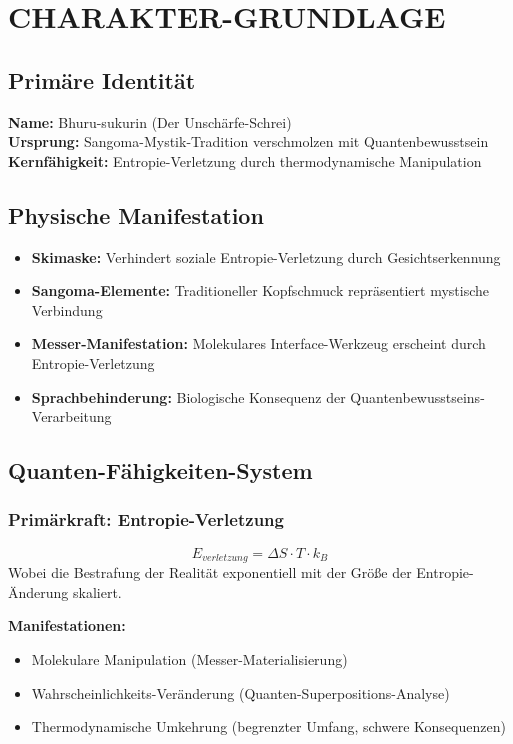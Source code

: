 \documentclass[12pt,a4paper]{article}
\begin{document}
\section{CHARAKTER-GRUNDLAGE}

\subsection{Primäre Identität}
\textbf{Name:} Bhuru-sukurin (Der Unschärfe-Schrei)\\
\textbf{Ursprung:} Sangoma-Mystik-Tradition verschmolzen mit Quantenbewusstsein\\
\textbf{Kernfähigkeit:} Entropie-Verletzung durch thermodynamische Manipulation

\subsection{Physische Manifestation}
\begin{itemize}
\item \textbf{Skimaske:} Verhindert soziale Entropie-Verletzung durch Gesichtserkennung
\item \textbf{Sangoma-Elemente:} Traditioneller Kopfschmuck repräsentiert mystische Verbindung
\item \textbf{Messer-Manifestation:} Molekulares Interface-Werkzeug erscheint durch Entropie-Verletzung
\item \textbf{Sprachbehinderung:} Biologische Konsequenz der Quantenbewusstseins-Verarbeitung
\end{itemize}

\subsection{Quanten-Fähigkeiten-System}

\subsubsection{Primärkraft: Entropie-Verletzung}
\[E_{verletzung} = \Delta S \cdot T \cdot k_B\]
Wobei die Bestrafung der Realität exponentiell mit der Größe der Entropie-Änderung skaliert.

\textbf{Manifestationen:}
\begin{itemize}
\item Molekulare Manipulation (Messer-Materialisierung)
\item Wahrscheinlichkeits-Veränderung (Quanten-Superpositions-Analyse)
\item Thermodynamische Umkehrung (begrenzter Umfang, schwere Konsequenzen)
\end{itemize}
\end{document}
